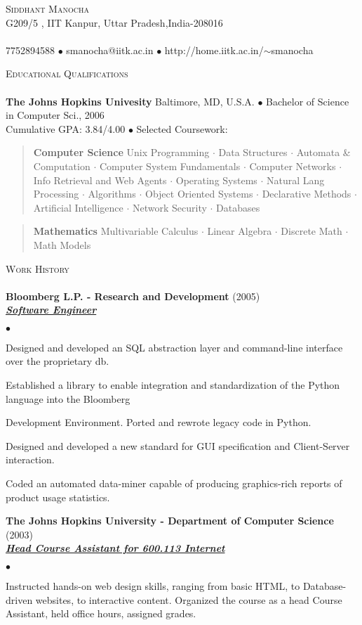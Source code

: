 \documentclass{article}
\newcommand{\area}[2]{\vspace*{-9pt} \begin{verse}\textbf{#1}   #2 \end{verse}  }
\newcommand{\lineunder}{\vspace*{-8pt} \\ \hspace*{-18pt} \hrulefill \\}
\newcommand{\header}[1]{{\hspace*{-15pt}\vspace*{6pt} \textsc{#1}} \vspace*{-6pt} \lineunder}
\newcommand{\employer}[3]{{ \textbf{#1} (#2)\\ \underline{\textbf{\emph{#3}}}\\  }}
\newcommand{\contact}[3]{
\vspace*{-8pt}
\begin{center}
{\LARGE \scshape {#1}}\\
#2 \lineunder 
#3
\end{center}
\vspace*{-8pt}
}
\newenvironment{achievements}{\begin{list}{$\bullet$}{\topsep 0pt \itemsep -2pt}}{\vspace*{4pt}\end{list}}
\newcommand{\schoolwithcourses}[4]{
 \textbf{#1} #2 $\bullet$ #3\\ 
#4 $\bullet$  Selected Coursework:\\
\vspace*{5pt}
}
\begin{document}
\small
\smallskip
\vspace*{-44pt}

\contact{Siddhant Manocha}
{G209/5 , IIT Kanpur, Uttar Pradesh,India-208016}
{7752894588 $\bullet$ smanocha@iitk.ac.in  $\bullet$ http://home.iitk.ac.in/$\sim$smanocha}

\header{Educational Qualifications}

\schoolwithcourses{The Johns Hopkins Univesity}{Baltimore, MD, U.S.A.}{Bachelor of Science in Computer Sci., 2006}
{Cumulative GPA: 3.84/4.00}
	\area{Computer Science}{ Unix Programming $\cdot$ Data Structures $\cdot$ Automata \& Computation $\cdot$ Computer System
Fundamentals $\cdot$ Computer Networks $\cdot$ Info Retrieval and Web Agents $\cdot$ Operating Systems $\cdot$
Natural Lang Processing $\cdot$ Algorithms $\cdot$ Object Oriented Systems $\cdot$ Declarative Methods $\cdot$
Artificial Intelligence $\cdot$ Network Security $\cdot$ Databases}
	\area{Mathematics}{Multivariable Calculus $\cdot$ Linear Algebra $\cdot$ Discrete Math $\cdot$ Math Models}

\header{Work History}
\employer{Bloomberg L.P. - Research and Development}{2005}{Software Engineer}
	\begin{achievements}
	\item Designed and developed an SQL abstraction layer and command-line interface over the proprietary db.
	\item Established a library to enable integration and standardization of the Python language into the Bloomberg
	\item Development Environment. Ported and rewrote legacy code in Python.
	\item Designed and developed a new standard for GUI specification and Client-Server interaction.
	\item Coded an automated data-miner capable of producing graphics-rich reports of product usage statistics.
	\end{achievements}

\employer{The Johns Hopkins University - Department of Computer Science}{2003}{Head Course Assistant for 600.113 Internet}
	\begin{achievements}
	\item Instructed hands-on web design skills, ranging from basic HTML, to Database-driven websites, to interactive content. Organized the course as a head Course Assistant, held office hours, assigned grades.
	\end{achievements}
\end{document}

